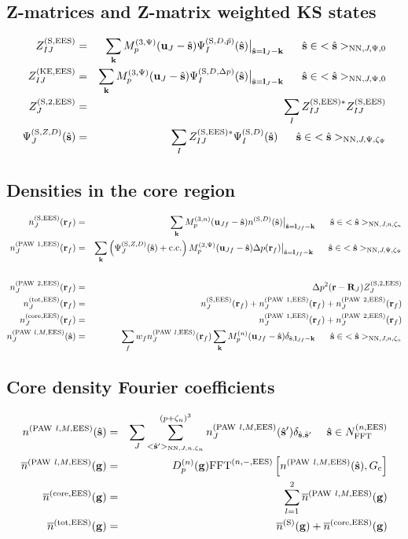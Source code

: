 \documentclass[paper=a4, fontsize=11pt]{article} %
\numberwithin{equation}{section} %
\numberwithin{figure}{section} %
\numberwithin{table}{section} %
\newcommand{\ol}{\overline}
\newcommand{\bu}{{\bf{u}}}
\newcommand{\bl}{{\bf{l}}}
\newcommand{\bk}{{\bf{k}}}
\newcommand{\bs}{{\bf{s}}}
\newcommand{\bg}{{\bf{g}}}
\newcommand{\br}{{\bf{r}}}
\newcommand{\bR}{{\bf{R}}}
\newcommand{\hs}{{\hat{\bf{s}}}}
\newcommand{\rS}{{\mathrm{S}}}
\newcommand{\rKE}{{\mathrm{KE}}}
\newcommand{\rEES}{{\mathrm{EES}}}
\newcommand{\rcore}{{\mathrm{core}}}
\newcommand{\rNN}{{\mathrm{NN}}}
\newcommand{\rcc}{{\mathrm{c.c.}}}
\newcommand{\rP}{{\mathrm{PAW}}}
\newcommand{\rtot}{{\mathrm{tot}}}
\newcommand{\NFFTnEES}{{N^{(n,\rEES)}_{\mathrm{FFT}}}}
\newcommand{\Gc}{{G_{\mathrm{c}}}}
\newcommand{\Dng}{{D^{(n)}_p(\bg)}}
\newcommand{\Mn}{{M_p^{(3,n)}}}
\newcommand{\Mp}{{M_p^{(3,\Psi)}}}
\newcommand{\FFTniEES}{{\mathrm{FFT}^{(n,-,\rEES)}}}
\newcommand{\pzn}{{(p+\zeta_n)^3}}
\newcommand{\hsJp}{{<\hs>_{\rNN,J,\Psi,\zeta_\Psi}}}
\newcommand{\hsJn}{{<\hs>_{\rNN,J,n,\zeta_n}}}
\newcommand{\hsJpzr}{{<\hs>_{\rNN,J,\Psi,0}}}
\newcommand{\hsinJp}{{\ \ \ \ \ \hs  \in  \hsJp}}
\newcommand{\hsinJn}{{\ \ \ \ \ \hs  \in  \hsJn}}
\newcommand{\hsinJpzr}{{\ \ \ \ \ \hs  \in  \hsJpzr}}
\newcommand{\hspJn}{{<\hs'>_{\rNN,J,n,\zeta_n}}}
\newcommand{\hsinnEES}{{\ \ \ \ \hs \in \NFFTnEES}}
\begin{document}
\subsection{Z-matrices and Z-matrix weighted KS states}
\begin{eqnarray}
\label{gr:ZSEES}
Z_{IJ}^{(\rS,\rEES)}&=& \sum_{\bk} \Mp(\bu_{J}-\hat \bs)\Psi_I^{(\rS,D,\tilde p)}(\hs)\big|_{\hat \bs=\bl_J-\bk}  \hsinJpzr\\
\label{gr:ZKEEES}
Z_{IJ}^{(\rKE,\rEES)}
&=& \sum_{\bk} \Mp(\bu_{J}-\hat \bs) \Psi_I^{(\rS,D,\Delta p)}(\hs)\big|_{\hat \bs=\bl_J-\bk}  \hsinJpzr\\
Z_J^{(\rS,2,\rEES)} &=& \sum_I Z_{IJ}^{(\rS,\rEES)*}Z_{IJ}^{(\rS,\rEES)}\\
\label{Z:sphiZSD}
\Psi_J^{(\rS,Z,D)}(\hat \bs) &=& \sum_I Z_{IJ}^{(\rS,\rEES)*} \Psi_I^{(\rS,D)}(\hs)\hsinJp 
\end{eqnarray}

\subsection{Densities in the core region}
\begin{eqnarray}
n_J^{(\rS,\rEES)}(\br_f) &=& \sum_{\bk} \Mn(\bu_{Jf}-\hat \bs) n^{(\rS,D)}(\hat \bs)\big|_{\hat \bs=\bl_{Jf}-\bk} \hsinJn\\
n_J^{(\rP\ 1,\rEES)}(\br_f)
&=&\sum_{\bk} \left(\Psi_J^{(\rS,Z,D)}(\hs)+ \rcc\right) \Mp(\bu_{Jf}-\hat \bs) \Delta p(\br_f)\big|_{\hs=\bl_{Jf}-\bk}\hsinJp \nonumber\\
&\ &\\
n_J^{(\rP\ 2,\rEES)}(\br_f)&=&\Delta p^2(\br-\bR_J) Z_J^{(\rS,2,\rEES)}\\
n^{(\rtot,\rEES)}_J(\br_f)
&=& n^{(\rS,\rEES)}_J(\br_f) + n^{(\rP\ 1,\rEES)}_J(\br_f) +n^{(\rP\ 2,\rEES)}_J(\br_f)\\
\label{gr:ncorerf}
n^{(\rcore,\rEES)}_J(\br_f)
&=& n^{(\rP\ 1,\rEES)}_J(\br_f) +n^{(\rP\ 2,\rEES)}_J(\br_f)\\
n_J^{(\rP\ l,M,\rEES)}(\hat \bs) &=&\sum_f w_f n_J^{(\rP\ l,\rEES)}(\br_f) \sum_{\bk}  M_p^{(n)}(\bu_{Jf}-\hat \bs)\delta_{\hat \bs,\bl_{Jf}-\bk} \hsinJn
\end{eqnarray}
\subsection{Core density Fourier coefficients}
\begin{eqnarray}
n^{(\rP\ l,M,\rEES)}(\hat \bs) &=& \sum_J \sum_{\hspJn}^{\pzn} n_J^{(\rP\ l,M,\rEES)}(\hs') \delta_{\hs,\hs'} \hsinnEES\\
\label{gr:ngPAWlMEES}
 \ol n^{(\rP\ l,M,\rEES)}(\bg)
 &=& \Dng \FFTniEES \left[ n^{(\rP\ l,M,\rEES)}(\hat \bs), \Gc \right]\\
 \ol n^{(\rcore,\rEES)}(\bg)&=&\sum_{l=1}^2 \ol n^{(\rP\ l,M,\rEES)}(\bg) \\
  \ol n^{(\rtot,\rEES)}(\bg) &=&  \ol n^{(\rS)}(\bg)+ \ol n^{(\rcore,\rEES)}(\bg)
\end{eqnarray}
\end{document}
